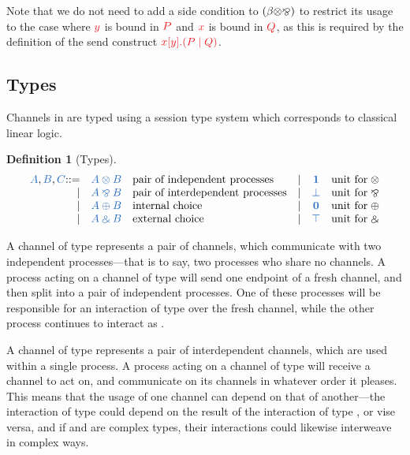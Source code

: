 \documentclass[copyright,creativecommons]{eptcs}
\def\Coloneqq{\mathbin{::=}}
\newtheorem{definition}[lemma]{Definition}
\begin{document}
Note that we do not need to add a side condition to $(\beta{\ensuremath{\otimes}}{\mathbin{\bindnasrepma}})$ to restrict its usage to the case where $\tm{y}$ is bound in $\tm{P}$ and $\tm{x}$ is bound in $\tm{Q}$, as this is required by the definition of the send construct $\tm{\cpSend{x}{y}{P}{Q}}$.

\subsection{Types}
Channels in \cp are typed using a session type system which corresponds to classical linear logic.
\begin{definition}[Types]\label{def:cp-types}
  \[
    \begin{array}{rclrcl}
      \ty{A}, \ty{B}, \ty{C}
           \Coloneqq & \ty{A \tens B} &\text{pair of independent processes}
      &  \mid& \ty{\one}      &\text{unit for} \; {\tens}
      \\ \mid& \ty{A \parr B} &\text{pair of interdependent processes}
      &  \mid& \ty{\bot}      &\text{unit for} \; {\parr}
      \\ \mid& \ty{A \plus B} &\text{internal choice}
      &  \mid& \ty{\nil}      &\text{unit for} \; {\plus}
      \\ \mid& \ty{A \with B} &\text{external choice}
      &  \mid& \ty{\top}      &\text{unit for} \; {\with}
    \end{array}
  \]
\end{definition}\noindent

A channel of type  represents a pair of channels, which communicate with two independent processes---that is to say, two processes who share no channels. A process acting on a channel of type  will send one endpoint of a fresh channel, and then split into a pair of independent processes. One of these processes will be responsible for an interaction of type  over the fresh channel, while the other process continues to interact as .

A channel of type  represents a pair of interdependent channels, which are used within a single process. A process acting on a channel of type  will receive a channel to act on, and communicate on its channels in whatever order it pleases. This means that the usage of one channel can depend on that of another---\eg the interaction of type  could depend on the result of the interaction of type , or vise versa, and if  and  are complex types, their interactions could likewise interweave in complex ways.
\end{document}
